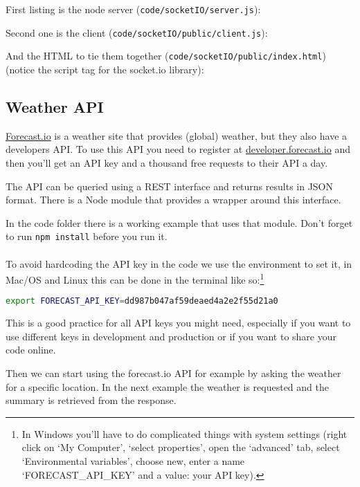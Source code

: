 \documentclass[a4paper]{report}
\begin{document}
First listing is the node server (\texttt{code/socketIO/server.js}): 
 
 
\noindent Second one is the client (\texttt{code/socketIO/public/client.js}): 
 
 
\noindent And the HTML to tie them together (\texttt{code/socketIO/public/index.html}) (notice the script tag for the socket.io library): 
 
 
\subsection*{Weather API} 
\href{http://forecast.io/}{Forecast.io} is a weather site that provides (global) weather, but they also have a developers API. To use this API you need to register at \href{https://developer.forecast.io/}{developer.forecast.io} and then you'll get an API key and a thousand free requests to their API a day. 
 
The API can be queried using a REST interface and returns results in JSON format. There is a Node module that provides a wrapper around this interface. 
 
In the code folder there is a working example that uses that module. Don't forget to run \colorbox{codecol}{\lstinline[language=bash]{npm install}} before you run it. 
\\ 
\\ 
\noindent To avoid hardcoding the API key in the code we use the environment to set it, in Mac/OS and Linux this can be done in the terminal like so:\footnote{In Windows you'll have to do complicated things with system settings (right click on `My Computer', `select properties', open the `advanced' tab, select `Environmental variables', choose new, enter a name `FORECAST\_API\_KEY' and a value: your API key).} 
\begin{lstlisting}[language=bash] 
export FORECAST_API_KEY=dd987b047af59deaed4a2e2f55d21a0 
\end{lstlisting} 
 
\noindent This is a good practice for all API keys you might need, especially if you want to use different keys in development and production or if you want to share your code online. 
 
\noindent Then we can start using the forecast.io API for example by asking the weather for a specific location. In the next example the weather is requested and the summary is retrieved from the response. 
 
\end{document}
